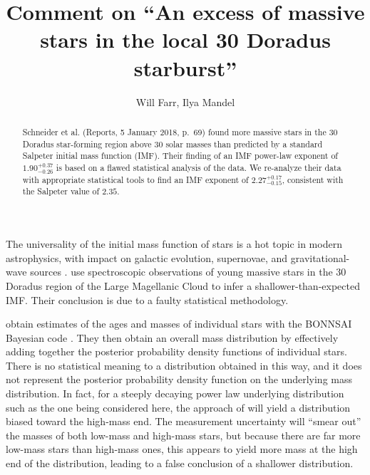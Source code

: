 \documentclass[apjl]{emulateapj}
\newcommand{\onesigrange}[3]{\ensuremath{#1^{+#2}_{-#3}}}
\newcommand{\alpharange}{\onesigrange{2.27}{0.17}{0.15}}
\begin{document}
\title{Comment on ``An excess of massive stars in the local 30 Doradus starburst''}

\author{Will Farr, Ilya Mandel}

\begin{abstract}
Schneider et al. (Reports, 5 January 2018, p.~69) found more massive stars in the 30 Doradus star-forming region above 30 solar masses than predicted by a standard Salpeter initial mass function (IMF).  Their finding of an IMF power-law exponent of $1.90^{+0.37}_{-0.26}$ is based on a flawed statistical analysis of the data.  We re-analyze their data with appropriate statistical tools to find an IMF exponent of $\alpharange$, consistent with the Salpeter value of $2.35$.
\end{abstract}

\maketitle

The universality of the initial mass function of stars is a hot topic in modern astrophysics, with impact on galactic evolution, supernovae, and gravitational-wave sources \cite{Kroupa:review,Bastian:2010}.    \citet{Schneider:2018} use spectroscopic observations of young massive stars in the 30 Doradus region of the Large Magellanic Cloud to infer a shallower-than-expected IMF.  Their conclusion is due to a faulty statistical methodology.

\citet{Schneider:2018} obtain estimates of the ages and masses of individual stars with the BONNSAI Bayesian code \cite{Schneider:Bonn}.  They then obtain an overall mass distribution by effectively adding together the posterior probability density functions of individual stars.  There is no statistical meaning to a distribution obtained in this way, and it does not represent the posterior probability density function on the underlying mass distribution.  In fact, for a steeply decaying power law underlying distribution such as the one being considered here, the approach of \cite{Schneider:2018} will yield a distribution biased toward the high-mass end.  The measurement uncertainty will ``smear out'' the masses of both low-mass and high-mass stars, but because there are far more low-mass stars than high-mass ones, this appears to yield more mass at the high end of the distribution, leading to a false conclusion of a shallower distribution.
\end{document}
